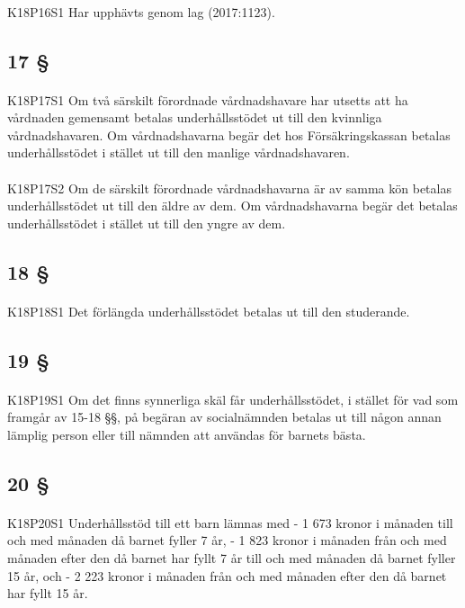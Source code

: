 \documentclass[a4paper,notitlepage,openany,10pt]{book}
\begin{document}
\paragraph*{}
{\tiny K18P16S1}
Har upphävts genom
lag (2017:1123).
\subsection*{17 §}
\paragraph*{}
{\tiny K18P17S1}
Om två särskilt förordnade vårdnadshavare har utsetts att ha vårdnaden gemensamt betalas underhållsstödet ut till den kvinnliga vårdnadshavaren. Om vårdnadshavarna begär det hos Försäkringskassan betalas underhållsstödet i stället ut till den manlige vårdnadshavaren.
\paragraph*{}
{\tiny K18P17S2}
Om de särskilt förordnade vårdnadshavarna är av samma kön betalas underhållsstödet ut till den äldre av dem. Om vårdnadshavarna begär det betalas underhållsstödet i stället ut till den yngre av dem.
\subsection*{18 §}
\paragraph*{}
{\tiny K18P18S1}
Det förlängda underhållsstödet betalas ut till den studerande.
\subsection*{19 §}
\paragraph*{}
{\tiny K18P19S1}
Om det finns synnerliga skäl får underhållsstödet, i stället för vad som framgår av 15-18 §§, på begäran av socialnämnden betalas ut till någon annan lämplig person eller till nämnden att användas för barnets bästa.
\subsection*{20 §}
\paragraph*{}
{\tiny K18P20S1}
Underhållsstöd till ett barn lämnas med
\newline - 1 673 kronor i månaden till och med månaden då barnet fyller 7 år,
\newline - 1 823 kronor i månaden från och med månaden efter den då barnet har fyllt 7 år till och med månaden då barnet fyller 15 år, och
\newline - 2 223 kronor i månaden från och med månaden efter den då barnet har fyllt 15 år.
\end{document}
